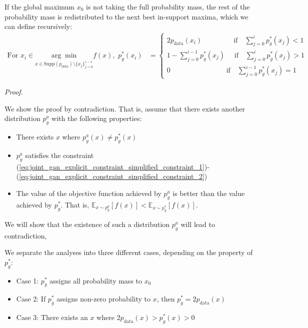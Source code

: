 If the global maximum $x_0$ is not taking the full probability mass, the rest of the probability mass is redistributed to the next best in-support maxima, which 
we can define recursively:
\begin{align}
         \text{For} \,\, x_i \in \underset{x \in \text{Supp}( p_{\text{data}} )  \setminus \{ x_j \}_{j=0}^{i-1} }{\arg\min} f(x), \,\,
    p^*_{g} (x_i) & = \begin{cases}
      2p_{\text{data}} (x_i)\quad \quad \quad \quad \,\,\, \text{if} \quad \sum_{j=0}^i p^*_g(x_j) < 1 \\
      1 -  \sum_{j=0}^{i-1} p^*_g(x_j) \quad \,\, \text{if} \quad \sum_{j=0}^i p^*_g(x_j) > 1 \\ 
      0 \quad \quad \quad \quad \quad \quad \quad \quad  \text{if} \quad \sum_{j=0}^{i-1} p^*_g(x_j) = 1 
    \end{cases}       
\end{align}

\textit{Proof.} 



We show the proof by contradiction. That is, assume that there exists another distribution $p^a_g$ with the following properties:
\begin{itemize}
    \item There exists $x$ where $p^a_g(x) \neq p_g^*(x)$
    \item $p^a_g$ satisfies the constraint (\ref{eq:joint_gan_explicit_constraint_simplified_constraint_1})-(\ref{eq:joint_gan_explicit_constraint_simplified_constraint_2})
    \item The value of the objective function achieved by $p^a_g$ is better than the value achieved by $p_g^*$. That is, $\mathbb{E}_{x \sim p^a_g} [ f ( x ) ] < \mathbb{E}_{x \sim p^*_g} [ f ( x ) ]$.
\end{itemize}
We will show that the existence of such a distribution $p^a_g$ will lead to contradiction,

We separate the analyses into three different cases, depending on the property of $p_g^*$: 
\begin{itemize}
    \item Case 1: $p_g^*$ assigns all probability mass to $x_0$
    \item Case 2: If $p_g^*$ assigns non-zero probability to $x$, then $p_g^* = 2p_{\text{data}} (x)$
    \item Case 3: There exists an $x$ where $ 2 p_{\text{data}} (x) >  p_g^*(x) > 0$ 
\end{itemize}

